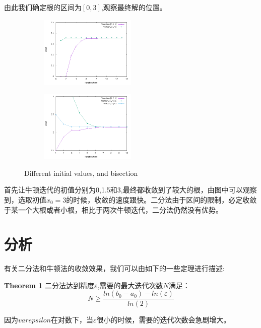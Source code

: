 \documentclass{ctexart}
\begin{document}
由此我们确定根的区间为$[0,3]$,观察最终解的位置。
\begin{figure}[H]
  \begin{subfigure}{0.7\linewidth}
  \centering
  \includegraphics[width=0.5\textwidth]{graph4.png}
  \end{subfigure}
  \begin{subfigure}{0.7\linewidth}
  \centering
  \includegraphics[width=0.5\textwidth]{graph5.png}
  \end{subfigure}
  \caption{Different initial values, and bisection}
\end{figure}

首先让牛顿迭代的初值分别为0,1.5和3,最终都收敛到了较大的根，由图中可以观察到，选取初值$x_0=3$的时候，收敛的速度跟快。二分法由于区间的限制，必定收敛于某一个大根或者小根，相比于两次牛顿迭代，二分法仍然没有优势。

\section{分析}
有关二分法和牛顿法的收敛效果，我们可以由如下的一些定理进行描述:

\textbf{Theorem 1}{} 二分法达到精度$\varepsilon$,需要的最大迭代次数$N$满足：
\begin{equation}
  N \ge \frac{ln(b_0-a_0)-ln(\varepsilon)}{ln(2)}
\end{equation}

因为$varepsilon$在对数下，当$\varepsilon$很小的时候，需要的迭代次数会急剧增大。
\end{document}
